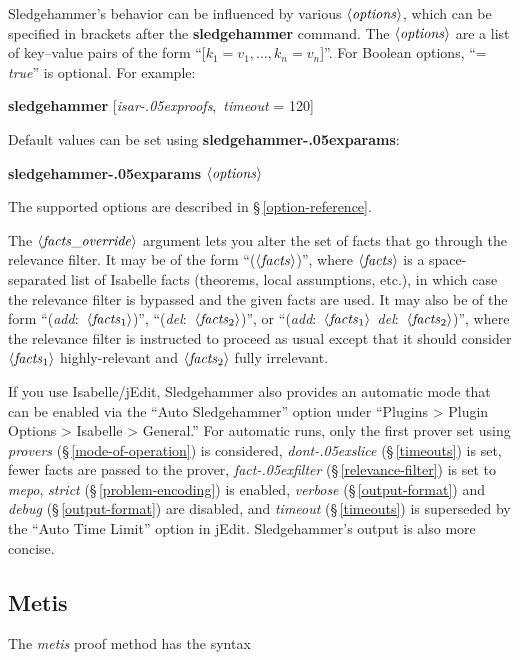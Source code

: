 \documentclass[a4paper,12pt]{article}
\let\oldS=\S
\def\S{\oldS\,}
\def\qty#1{\ensuremath{\left<\mathit{#1\/}\right>}}
\renewcommand\_{\hbox{\textunderscore\kern-.05ex}}
\begin{document}
Sledgehammer's behavior can be influenced by various \qty{options}, which can be
specified in brackets after the \textbf{sledgehammer} command. The
\qty{options} are a list of key--value pairs of the form ``[$k_1 = v_1,
\ldots, k_n = v_n$]''. For Boolean options, ``= \textit{true\/}'' is optional.
For example:

\prew
\textbf{sledgehammer} [\textit{isar\_proofs}, \,\textit{timeout} = 120]
\postw

Default values can be set using \textbf{sledgehammer\_\allowbreak params}:

\prew
\textbf{sledgehammer\_params} \qty{options}
\postw

The supported options are described in \S\ref{option-reference}.

The \qty{facts\_override} argument lets you alter the set of facts that go
through the relevance filter. It may be of the form ``(\qty{facts})'', where
\qty{facts} is a space-separated list of Isabelle facts (theorems, local
assumptions, etc.), in which case the relevance filter is bypassed and the given
facts are used. It may also be of the form ``(\textit{add}:\ \qty{facts\/_{\mathrm{1}}})'',
``(\textit{del}:\ \qty{facts\/_{\mathrm{2}}})'', or ``(\textit{add}:\ \qty{facts\/_{\mathrm{1}}}\
\textit{del}:\ \qty{facts\/_{\mathrm{2}}})'', where the relevance filter is instructed to
proceed as usual except that it should consider \qty{facts\/_{\mathrm{1}}}
highly-relevant and \qty{facts\/_{\mathrm{2}}} fully irrelevant.

If you use Isabelle/jEdit, Sledgehammer also provides an automatic mode that can
be enabled via the ``Auto Sledgehammer'' option under ``Plugins > Plugin Options
> Isabelle > General.'' For automatic runs, only the first prover set using
\textit{provers} (\S\ref{mode-of-operation}) is considered,
\textit{dont\_slice} (\S\ref{timeouts}) is set, fewer facts are
passed to the prover, \textit{fact\_filter} (\S\ref{relevance-filter}) is set to
\textit{mepo}, \textit{strict} (\S\ref{problem-encoding}) is enabled,
\textit{verbose} (\S\ref{output-format}) and \textit{debug}
(\S\ref{output-format}) are disabled, and \textit{timeout} (\S\ref{timeouts}) is
superseded by the ``Auto Time Limit'' option in jEdit. Sledgehammer's output is
also more concise.


\subsection{Metis}
\label{metis}

The \textit{metis} proof method has the syntax
\end{document}
